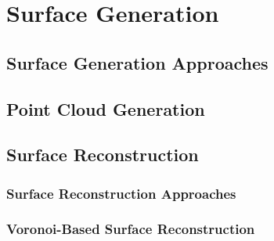 \chapter{Surface Generation}
%

\section{Surface Generation Approaches}
\label{Surface Generation Approaches}

\section{Point Cloud Generation}
\label{Point Cloud Generation}

\section{Surface Reconstruction}
\label{Surface Reconstruction}

\subsection{Surface Reconstruction Approaches}
\label{Surface Reconstruction Approaches}

\subsection{Voronoi-Based Surface Reconstruction}
\label{Voronoi-Based Surface Reconstruction}

